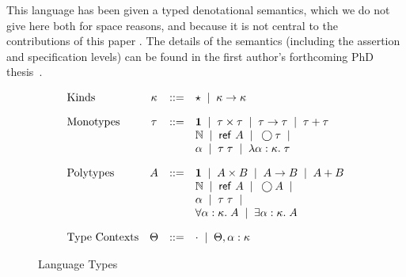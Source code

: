 \documentclass[preprint,natbib]{sigplanconf}
\begin{document}
This language has been given a typed denotational semantics, which we
do not give here both for space reasons, and because it is not central
to the contributions of this paper . The details of the semantics
(including the assertion and specification levels) can be found in the
first author's forthcoming PhD thesis~\cite{tech-report}.

\begin{figure}
\begin{displaymath}
  \begin{array}{lcll}
    \mbox{Kinds} & 
      \kappa & ::= & \star \;\;|\;\; \kappa \to \kappa 
    \\[1em]
     \mbox{Monotypes} & 
      \tau & ::= & 
         \mathbf{1} \;\;|\;\; 
         \tau \times \tau \;\;|\;\; 
         \tau \to \tau \;\;|\;\; 
         \tau + \tau \\
     &&& \mathbb{N} \;\;|\;\; 
         \mbox{\textsf{{ref }}}A \;\;|\;\;
         \bigcirc{\tau} \;\;|\;\; \\
     &&& \alpha \;\;|\;\;
         \tau\;\tau \;\;|\;\; 
         \lambda \alpha:\kappa.\;\tau 
    \\[1em]
    \mbox{Polytypes} & 
      A & ::= & 
         \mathbf{1} \;\;|\;\; 
         A \times B \;\;|\;\; 
         A \to B \;\;|\;\;
         A + B \\
    &&&  \mathbb{N} \;\;|\;\; 
         \mbox{\textsf{{ref }}}A \;\;|\;\;
         \bigcirc{A} \;\;|\;\; \\
    &&&  \alpha \;\;|\;\;
         \tau\;\tau \;\;|\;\; \\
    &&&  \forall \alpha:\kappa.\; A \;\;|\;\; 
         \exists \alpha:\kappa.\; A \\[1em]
    \mbox{Type Contexts} & 
      \Theta & ::= & \cdot \;\;|\;\; \Theta, \alpha:\kappa \\
  \end{array}
\end{displaymath}
\caption{Language Types}
\label{type-syntax}
\end{figure}
\end{document}
